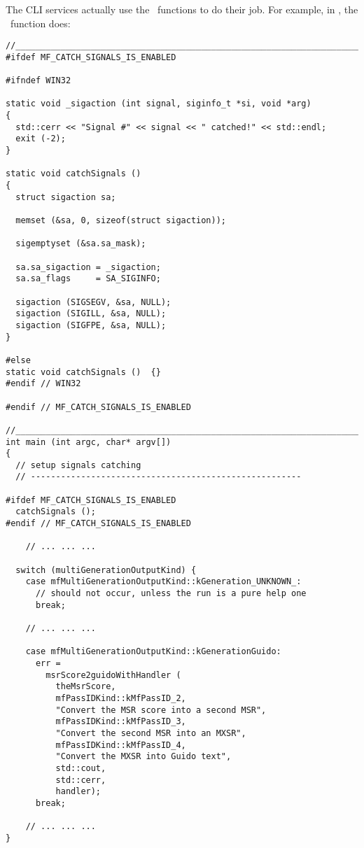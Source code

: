 The CLI services actually use the \API\ functions to do their job. For example, in {\tt }, the \mainFunction\ function does:
\begin{lstlisting}[language=CPlusPlus]
//_______________________________________________________________________________
#ifdef MF_CATCH_SIGNALS_IS_ENABLED

#ifndef WIN32

static void _sigaction (int signal, siginfo_t *si, void *arg)
{
  std::cerr << "Signal #" << signal << " catched!" << std::endl;
  exit (-2);
}

static void catchSignals ()
{
  struct sigaction sa;

  memset (&sa, 0, sizeof(struct sigaction));

  sigemptyset (&sa.sa_mask);

  sa.sa_sigaction = _sigaction;
  sa.sa_flags     = SA_SIGINFO;

  sigaction (SIGSEGV, &sa, NULL);
  sigaction (SIGILL, &sa, NULL);
  sigaction (SIGFPE, &sa, NULL);
}

#else
static void catchSignals ()  {}
#endif // WIN32

#endif // MF_CATCH_SIGNALS_IS_ENABLED

//_______________________________________________________________________________
int main (int argc, char* argv[])
{
  // setup signals catching
  // ------------------------------------------------------

#ifdef MF_CATCH_SIGNALS_IS_ENABLED
  catchSignals ();
#endif // MF_CATCH_SIGNALS_IS_ENABLED

	// ... ... ...

  switch (multiGenerationOutputKind) {
    case mfMultiGenerationOutputKind::kGeneration_UNKNOWN_:
      // should not occur, unless the run is a pure help one
      break;

  	// ... ... ...

    case mfMultiGenerationOutputKind::kGenerationGuido:
      err =
        msrScore2guidoWithHandler (
          theMsrScore,
          mfPassIDKind::kMfPassID_2,
          "Convert the MSR score into a second MSR",
          mfPassIDKind::kMfPassID_3,
          "Convert the second MSR into an MXSR",
          mfPassIDKind::kMfPassID_4,
          "Convert the MXSR into Guido text",
          std::cout,
          std::cerr,
          handler);
      break;

	// ... ... ...
}
\end{lstlisting}


